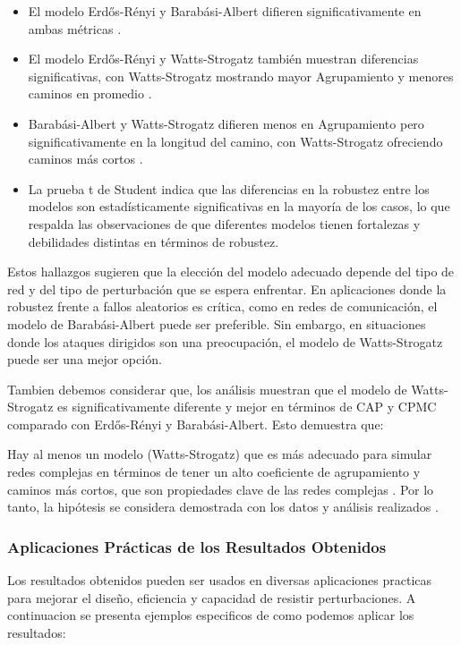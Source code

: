 \begin{itemize}
    \item El modelo Erdős-Rényi y Barabási-Albert difieren significativamente en ambas métricas .
    \item El modelo Erdős-Rényi y Watts-Strogatz también muestran diferencias significativas, con Watts-Strogatz mostrando mayor Agrupamiento y menores caminos en promedio .
    \item Barabási-Albert y Watts-Strogatz difieren menos en Agrupamiento pero significativamente en la longitud del camino, con Watts-Strogatz ofreciendo caminos más cortos .
    \item La prueba t de Student indica que las diferencias en la robustez entre los modelos son estadísticamente significativas en la mayoría de los casos, lo que respalda las observaciones de que diferentes modelos tienen fortalezas y debilidades distintas en términos de robustez.
\end{itemize}

Estos hallazgos sugieren que la elección del modelo adecuado depende del tipo de red y del tipo de perturbación que se espera enfrentar. En aplicaciones donde la robustez frente a fallos aleatorios es crítica, como en redes de comunicación, el modelo de Barabási-Albert puede ser preferible. Sin embargo, en situaciones donde los ataques dirigidos son una preocupación, el modelo de Watts-Strogatz puede ser una mejor opción.

Tambien debemos considerar que, los análisis muestran que el modelo de Watts-Strogatz es significativamente diferente y mejor en términos de CAP y CPMC comparado con Erdős-Rényi y Barabási-Albert. Esto demuestra que:

Hay al menos un modelo (Watts-Strogatz) que es más adecuado para simular redes complejas en términos de tener un alto coeficiente de agrupamiento y caminos más cortos, que son propiedades clave de las redes complejas .
Por lo tanto, la hipótesis se considera demostrada con los datos y análisis realizados .

\subsubsection{Aplicaciones Prácticas de los Resultados Obtenidos}

Los resultados obtenidos pueden ser usados en diversas aplicaciones practicas para mejorar el diseño, eficiencia y capacidad de resistir perturbaciones.
A continuacion se presenta ejemplos especificos de como podemos aplicar los resultados:

